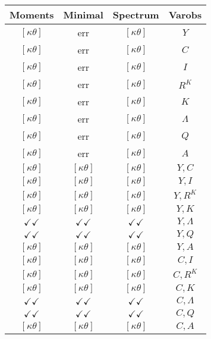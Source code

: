 \documentclass[a4paper,10pt]{article}
\begin{document}
\centering
\begin{longtable}{|c|c|c|c|}
\hline
Moments & Minimal & Spectrum & Varobs \\
\hline
$[\kappa \theta ]$ & err & $[\kappa \theta ]$ & ${Y}$ \\
\hline
$[\kappa \theta ]$ & err & $[\kappa \theta ]$ & ${C}$ \\
\hline
$[\kappa \theta ]$ & err & $[\kappa \theta ]$ & ${I}$ \\
\hline
$[\kappa \theta ]$ & err & $[\kappa \theta ]$ & ${R^{K}}$ \\
\hline
$[\kappa \theta ]$ & err & $[\kappa \theta ]$ & ${K}$ \\
\hline
$[\kappa \theta ]$ & err & $[\kappa \theta ]$ & ${\Lambda}$ \\
\hline
$[\kappa \theta ]$ & err & $[\kappa \theta ]$ & ${Q}$ \\
\hline
$[\kappa \theta ]$ & err & $[\kappa \theta ]$ & ${A}$ \\
\hline
$[\kappa \theta ]$ & $[\kappa \theta ]$ & $[\kappa \theta ]$ & ${Y},{C}$ \\
\hline
$[\kappa \theta ]$ & $[\kappa \theta ]$ & $[\kappa \theta ]$ & ${Y},{I}$ \\
\hline
$[\kappa \theta ]$ & $[\kappa \theta ]$ & $[\kappa \theta ]$ & ${Y},{R^{K}}$ \\
\hline
$[\kappa \theta ]$ & $[\kappa \theta ]$ & $[\kappa \theta ]$ & ${Y},{K}$ \\
\hline
$\checkmark\checkmark$ & $\checkmark\checkmark$ & $\checkmark\checkmark$ & ${Y},{\Lambda}$ \\
\hline
$\checkmark\checkmark$ & $\checkmark\checkmark$ & $\checkmark\checkmark$ & ${Y},{Q}$ \\
\hline
$[\kappa \theta ]$ & $[\kappa \theta ]$ & $[\kappa \theta ]$ & ${Y},{A}$ \\
\hline
$[\kappa \theta ]$ & $[\kappa \theta ]$ & $[\kappa \theta ]$ & ${C},{I}$ \\
\hline
$[\kappa \theta ]$ & $[\kappa \theta ]$ & $[\kappa \theta ]$ & ${C},{R^{K}}$ \\
\hline
$[\kappa \theta ]$ & $[\kappa \theta ]$ & $[\kappa \theta ]$ & ${C},{K}$ \\
\hline
$\checkmark\checkmark$ & $\checkmark\checkmark$ & $\checkmark\checkmark$ & ${C},{\Lambda}$ \\
\hline
$\checkmark\checkmark$ & $\checkmark\checkmark$ & $\checkmark\checkmark$ & ${C},{Q}$ \\
\hline
$[\kappa \theta ]$ & $[\kappa \theta ]$ & $[\kappa \theta ]$ & ${C},{A}$ \\

\end{longtable}
\end{document}
